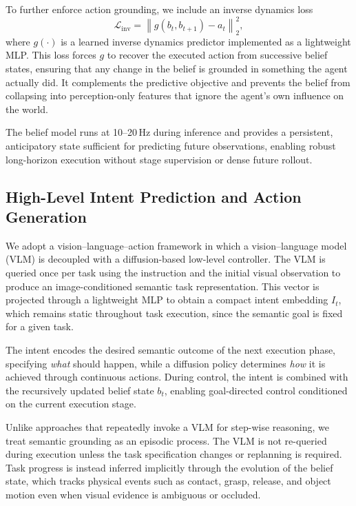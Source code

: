 \documentclass[12pt]{article}
\begin{document}
To further enforce action grounding, we include an inverse dynamics loss
\begin{equation}
\mathcal{L}_{\text{inv}}
=
\left\lVert g(b_t, b_{t+1}) - a_t \right\rVert_2^2 ,
\end{equation}
where $g(\cdot)$ is a learned inverse dynamics predictor implemented as a lightweight MLP. This loss forces $g$ to recover the executed action from successive belief states, ensuring that any change in the belief is grounded in something the agent actually did. It complements the predictive objective and prevents the belief from collapsing into perception-only features that ignore the agent's own influence on the world.

The belief model runs at 10--20\,Hz during inference and provides a persistent, anticipatory state sufficient for predicting future observations, enabling robust long-horizon execution without stage supervision or dense future rollout.

\subsection{High-Level Intent Prediction and Action Generation}
We adopt a vision--language--action framework in which a vision--language model (VLM) is decoupled with a diffusion-based low-level controller. The VLM is queried once per task using the instruction and the initial visual observation to produce an image-conditioned semantic task representation. This vector is projected through a lightweight MLP to obtain a compact intent embedding $I_t$, which remains static throughout task execution, since the semantic goal is fixed for a given task.

The intent encodes the desired semantic outcome of the next execution phase, specifying \emph{what} should happen, while a diffusion policy determines \emph{how} it is achieved through continuous actions. During control, the intent is combined with the recursively updated belief state $b_t$, enabling goal-directed control conditioned on the current execution stage.

Unlike approaches that repeatedly invoke a VLM for step-wise reasoning, we treat semantic grounding as an episodic process. The VLM is not re-queried during execution unless the task specification changes or replanning is required. Task progress is instead inferred implicitly through the evolution of the belief state, which tracks physical events such as contact, grasp, release, and object motion even when visual evidence is ambiguous or occluded.
\end{document}
